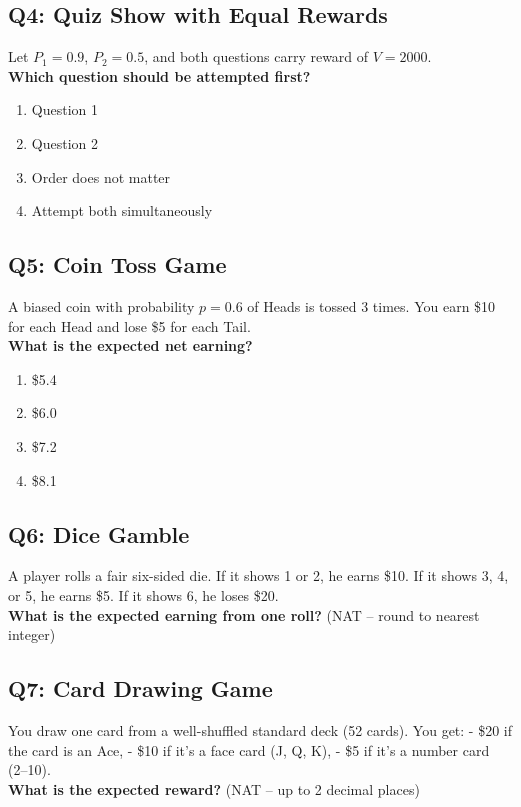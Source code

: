 \subsection*{Q4: Quiz Show with Equal Rewards}
Let $P_1 = 0.9$, $P_2 = 0.5$, and both questions carry reward of $V = 2000$.\\
\textbf{Which question should be attempted first?}

\begin{enumerate}[label=(\alph*)]
\item Question 1
\item Question 2
\item Order does not matter
\item Attempt both simultaneously
\end{enumerate}

\subsection*{Q5: Coin Toss Game}
A biased coin with probability $p = 0.6$ of Heads is tossed 3 times. You earn \$10 for each Head and lose \$5 for each Tail.\\
\textbf{What is the expected net earning?}

\begin{enumerate}[label=(\alph*)]
\item \$5.4
\item \$6.0
\item \$7.2
\item \$8.1
\end{enumerate}

\subsection*{Q6: Dice Gamble}
A player rolls a fair six-sided die. If it shows 1 or 2, he earns \$10. If it shows 3, 4, or 5, he earns \$5. If it shows 6, he loses \$20.\\
\textbf{What is the expected earning from one roll?} (NAT – round to nearest integer)

\subsection*{Q7: Card Drawing Game}
You draw one card from a well-shuffled standard deck (52 cards). You get:
- \$20 if the card is an Ace,
- \$10 if it's a face card (J, Q, K),
- \$5 if it's a number card (2–10).\\
\textbf{What is the expected reward?} (NAT – up to 2 decimal places)

